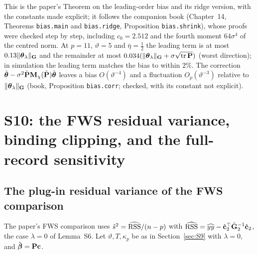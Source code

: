 This is the paper's Theorem on the leading-order bias and its ridge version, with the constants made explicit; it follows the companion book (Chapter~14, Theorems \texttt{bias.main} and \texttt{bias.ridge}, Proposition \texttt{bias.shrink}), whose proofs were checked step by step, including $c_0=2.512$ and the fourth moment $64\sigma^4$ of the centred norm. At $p=11$, $\vartheta=5$ and $\bar\eta=\tfrac12$ the leading term is at most $0.13\|\boldsymbol{\theta}_\lambda\|_{\mathbf{G}}$ and the remainder at most $0.034(\|\boldsymbol{\theta}_\lambda\|_{\mathbf{G}}+\sigma\sqrt{\operatorname{tr}\mathbf{P}})$ (worst direction); in simulation the leading term matches the bias to within $2\%$. The correction $\tilde{\boldsymbol{\theta}}-\sigma^2\tilde{\mathbf{P}}\mathbf{M}_\chi(\tilde{\mathbf{P}})\tilde{\boldsymbol{\theta}}$ leaves a bias $O(\vartheta^{-4})$ and a fluctuation $O_p(\vartheta^{-3})$ relative to $\|\boldsymbol{\theta}_\lambda\|_{\mathbf{G}}$ (book, Proposition \texttt{bias.corr}; checked, with its constant not explicit).

\section{S10: the FWS residual variance, binding clipping, and the full-record sensitivity}
\label{sec:S10}

\subsection{The plug-in residual variance of the FWS comparison}

The paper's FWS comparison uses $\hat s^2=\widehat{\mathrm{RSS}}/(n-p)$ with $\widehat{\mathrm{RSS}}=\widehat{yy}-\hat{\mathbf{c}}_2^\top\hat{\mathbf{G}}_2^{-1}\hat{\mathbf{c}}_2$, the case $\lambda=0$ of Lemma~S6. Let $\vartheta,T,\kappa_p$ be as in Section~\ref{sec:S9} with $\lambda=0$, and $\hat{\boldsymbol{\beta}}=\mathbf{P}\mathbf{c}$.

